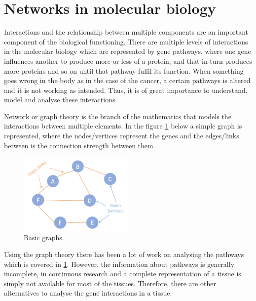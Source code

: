 \section{Networks in molecular biology}

Interactions and the relationship between multiple components are an important component of the biological functioning. There are multiple levels of interactions in the molecular biology which are represented by gene pathways, where one gene influences another to produce more or less of a protein, and that in turn produces more proteins and so on until that pathway fulfil its function. When something goes wrong in the body as in the case of the cancer, a certain pathways is altered and it is not working as intended. Thus, it is of great importance to understand, model and analyse these interactions.

Network or graph theory is the branch of the mathematics that models the interactions between multiple elements. In the figure \ref{fig:lit:basic_net} below a simple graph is represented, where the nodes/vertices represent the genes and the edges/links between is the connection strength between them. 

\begin{figure}[!htb]
  \centering\includegraphics[width=0.5\textwidth,height=0.5\textheight,keepaspectratio]{Sections/Lit_review/Resources/basic_graphs.png}
    \caption{Basic graphs.}
    \label{fig:lit:basic_net}
\end{figure}
\FloatBarrier

Using the graph theory there has been a lot of work on analysing the pathways which is covered in \ref{}. However, the information about pathways is generally incomplete, in continuous research and a complete representation of a tissue is simply not available for most of the tissues. Therefore, there are other alternatives to analyse the gene interactions in a tissue.

